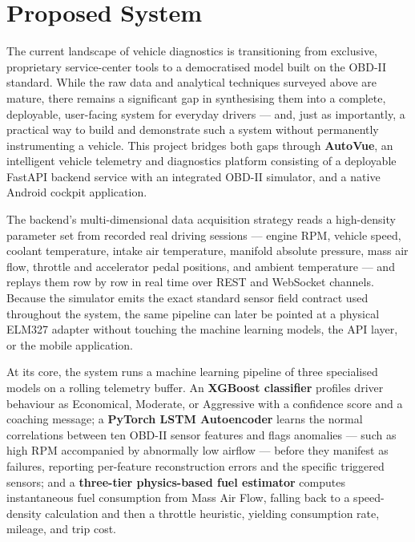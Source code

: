 \documentclass[10pt,a4paper]{report}
\begin{document}
\section{Proposed System}
The current landscape of vehicle diagnostics is transitioning from exclusive, proprietary service-center tools to a democratised model built on the OBD-II standard. While the raw data and analytical techniques surveyed above are mature, there remains a significant gap in synthesising them into a complete, deployable, user-facing system for everyday drivers — and, just as importantly, a practical way to build and demonstrate such a system without permanently instrumenting a vehicle. This project bridges both gaps through \textbf{AutoVue}, an intelligent vehicle telemetry and diagnostics platform consisting of a deployable FastAPI backend service with an integrated OBD-II simulator, and a native Android cockpit application. \par

The backend's multi-dimensional data acquisition strategy reads a high-density parameter set from recorded real driving sessions — engine RPM, vehicle speed, coolant temperature, intake air temperature, manifold absolute pressure, mass air flow, throttle and accelerator pedal positions, and ambient temperature — and replays them row by row in real time over REST and WebSocket channels. Because the simulator emits the exact standard sensor field contract used throughout the system, the same pipeline can later be pointed at a physical ELM327 adapter without touching the machine learning models, the API layer, or the mobile application. \par

At its core, the system runs a machine learning pipeline of three specialised models on a rolling telemetry buffer. An \textbf{XGBoost classifier} profiles driver behaviour as Economical, Moderate, or Aggressive with a confidence score and a coaching message; a \textbf{PyTorch LSTM Autoencoder} learns the normal correlations between ten OBD-II sensor features and flags anomalies — such as high RPM accompanied by abnormally low airflow — before they manifest as failures, reporting per-feature reconstruction errors and the specific triggered sensors; and a \textbf{three-tier physics-based fuel estimator} computes instantaneous fuel consumption from Mass Air Flow, falling back to a speed-density calculation and then a throttle heuristic, yielding consumption rate, mileage, and trip cost. \par
\end{document}
